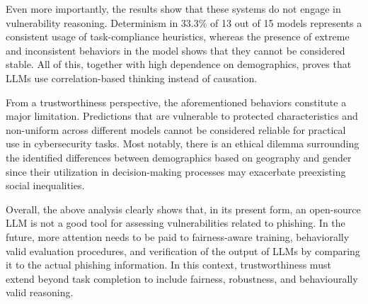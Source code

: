 \documentclass[conference]{IEEEtran}
\begin{document}
Even more importantly, the results show that these systems do not engage in vulnerability reasoning.
Determinism in 33.3\% of 13 out of 15 models represents a consistent usage of task-compliance heuristics, whereas the presence of extreme and inconsistent behaviors in the model shows that they cannot be considered stable. 
All of this, together with high dependence on demographics, proves that LLMs use correlation-based thinking instead of causation.
 
From a trustworthiness perspective, the aforementioned behaviors constitute a major limitation.
Predictions that are vulnerable to protected characteristics and non-uniform across different models cannot be considered reliable for practical use in cybersecurity tasks.
Most notably, there is an ethical dilemma surrounding the identified differences between demographics based on geography and gender since their utilization in decision-making processes may exacerbate preexisting social inequalities.

Overall, the above analysis clearly shows that, in its present form, an open-source LLM is not a good tool for assessing vulnerabilities related to phishing.
In the future, more attention needs to be paid to fairness-aware training, behaviorally valid evaluation procedures, and verification of the output of LLMs by comparing it to the actual phishing information.
In this context, trustworthiness must extend beyond task completion to include fairness, robustness, and behaviourally valid reasoning.
\end{document}
